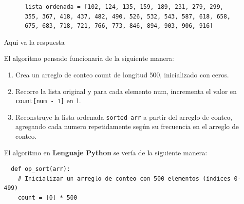 \documentclass[answers, 11pt]{exam}
\begin{document}
\begin{questions}
\begin{solution}
\begin{enumerate}
\begin{verbatim}
      lista_ordenada = [102, 124, 135, 159, 189, 231, 279, 299,
      355, 367, 418, 437, 482, 490, 526, 532, 543, 587, 618, 658,
      675, 683, 718, 721, 766, 773, 846, 894, 903, 906, 916]
    \end{verbatim}
  \end{enumerate}
\end{solution}


\begin{solution}
  Aqui va la respuesta
\end{solution}


\begin{solution}
  El algoritmo pensado funcionaria de la siguiente manera:
  \begin{enumerate}
    \item Crea un arreglo de conteo count de longitud 500, inicializado con ceros.
    \item Recorre la lista original y para cada elemento num, incrementa el valor en \verb|count[num - 1]| en 1.
    \item Reconstruye la lista ordenada \verb|sorted_arr| a partir del arreglo 
    de conteo, agregando cada numero repetidamente según su frecuencia en el arreglo de conteo.
  \end{enumerate}

  El algoritmo en \textbf{Lenguaje Python} se vería de la siguiente manera:

  \begin{verbatim}
  def op_sort(arr):
    # Inicializar un arreglo de conteo con 500 elementos (índices 0-499)
    count = [0] * 500


\end{verbatim}
\end{solution}
\end{questions}
\end{document}
